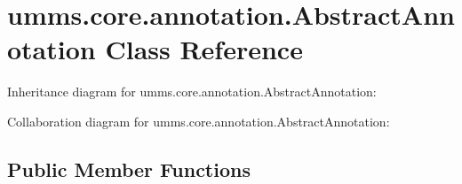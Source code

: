 \hypertarget{classumms_1_1core_1_1annotation_1_1_abstract_annotation}{\section{umms.\+core.\+annotation.\+Abstract\+Annotation Class Reference}
\label{classumms_1_1core_1_1annotation_1_1_abstract_annotation}
}


Inheritance diagram for umms.\+core.\+annotation.\+Abstract\+Annotation\+:


Collaboration diagram for umms.\+core.\+annotation.\+Abstract\+Annotation\+:
\subsection*{Public Member Functions}

